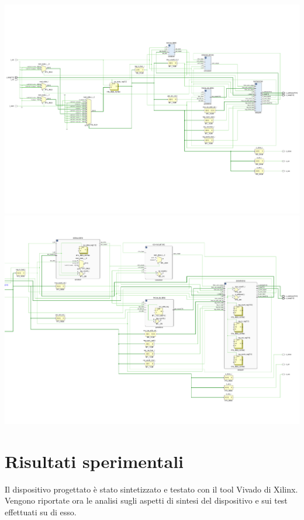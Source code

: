 \documentclass[a4paper]{report}
\begin{document}
\includegraphics[scale = 0.45]{schematics/schematic.pdf}
\\
\includegraphics[scale = 0.45]{schematics/schematicComplete.pdf}


\chapter{Risultati sperimentali}
\label{chap:Risultati sperimentali}
Il dispositivo progettato è stato sintetizzato e testato con il tool Vivado di Xilinx. Vengono riportate ora le analisi sugli aspetti di sintesi del dispositivo e sui test effettuati su di esso.
\end{document}
